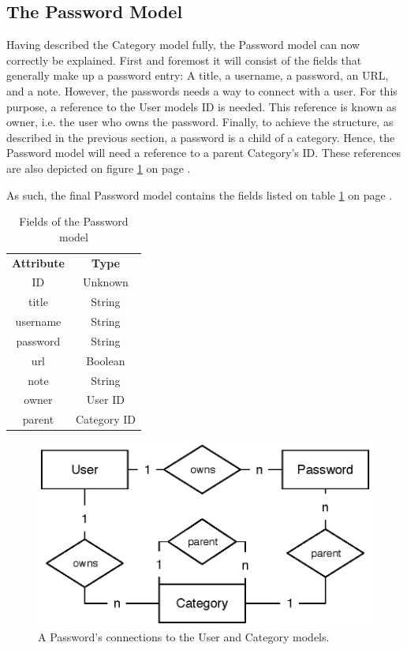 		\subsection{The Password Model}
			\label{sec:model:password}
			Having described the Category model fully, the Password model can now correctly be explained. First and foremost it will consist of the fields that generally make up a password entry: A title, a username, a password, an URL, and a note. However, the passwords needs a way to connect with a user. For this purpose, a reference to the User models ID is needed. This reference is known as owner, i.e. the user who owns the password. Finally, to achieve the structure, as described in the previous section, a password is a child of a category. Hence, the Password model will need a reference to a parent Category's ID. These references are also depicted on figure \ref{fig:relationship:password} on page \pageref{fig:relationship:password}.

			As such, the final Password model contains the fields listed on table \ref{fig:model:password} on page \pageref{fig:model:password}.

			\begin{table}[p]
				\centering
				\begin{tabular}{c|c}
					\textbf{Attribute} 		& \textbf{Type} 	\\
					ID 						& Unknown 			\\
					title 					& String 			\\
					username 				& String 			\\
					password 				& String 			\\
					url						& Boolean 			\\
					note  					& String 			\\
					owner 					& User ID 			\\
					parent 					& Category ID 		\\
				\end{tabular}
				\caption{Fields of the Password model}
				\label{fig:model:password}
			\end{table}
			
			\begin{figure}[p]
				\centering
				\includegraphics[scale=0.75]{figures/design/uml/erd/user-password-category.eps}
				\caption{A Password's connections to the User and Category models.}
				\label{fig:relationship:password}
			\end{figure}


